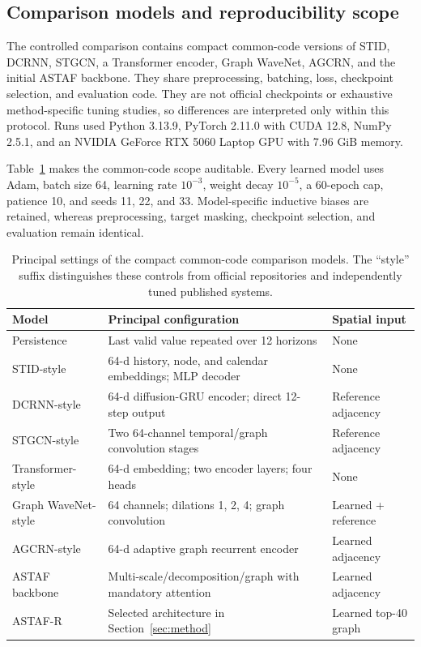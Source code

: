 \documentclass[fleqn,10pt]{wlscirep}
\newenvironment{changedcontent}{\color{changeblue}}{}
\begin{document}
\subsection{Comparison models and reproducibility scope}
The controlled comparison contains compact common-code versions of STID,
DCRNN, STGCN, a Transformer encoder, Graph WaveNet, AGCRN, and the initial
ASTAF backbone. They share preprocessing, batching, loss, checkpoint selection,
and evaluation code. They are not official checkpoints or exhaustive
method-specific tuning studies, so differences are interpreted only within
this protocol. Runs used Python 3.13.9, PyTorch 2.11.0 with CUDA 12.8, NumPy
2.5.1, and an NVIDIA GeForce RTX 5060 Laptop GPU with 7.96 GiB memory.

\begin{changedcontent}
Table~\ref{tab:baseline_settings} makes the common-code scope auditable.
Every learned model uses Adam, batch size 64, learning rate $10^{-3}$, weight
decay $10^{-5}$, a 60-epoch cap, patience 10, and seeds 11, 22, and 33.
Model-specific inductive biases are retained, whereas preprocessing, target
masking, checkpoint selection, and evaluation remain identical.
\begin{table}[t]
\centering
\caption{Principal settings of the compact common-code comparison models.
The ``style'' suffix distinguishes these controls from official repositories
and independently tuned published systems.}
\label{tab:baseline_settings}
\small
\begin{tabular}{lll}
\toprule
Model & Principal configuration & Spatial input\\
\midrule
Persistence & Last valid value repeated over 12 horizons & None\\
STID-style & 64-d history, node, and calendar embeddings; MLP decoder & None\\
DCRNN-style & 64-d diffusion-GRU encoder; direct 12-step output & Reference adjacency\\
STGCN-style & Two 64-channel temporal/graph convolution stages & Reference adjacency\\
Transformer-style & 64-d embedding; two encoder layers; four heads & None\\
Graph WaveNet-style & 64 channels; dilations 1, 2, 4; graph convolution & Learned + reference\\
AGCRN-style & 64-d adaptive graph recurrent encoder & Learned adjacency\\
ASTAF backbone & Multi-scale/decomposition/graph with mandatory attention & Learned adjacency\\
ASTAF-R & Selected architecture in Section~\ref{sec:method} & Learned top-40 graph\\
\bottomrule
\end{tabular}
\end{table}
\end{changedcontent}
\end{document}
